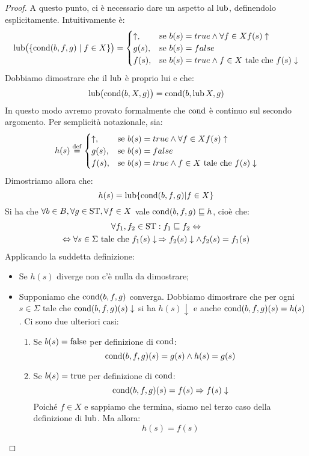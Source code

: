 \begin{proof}
A questo punto, ci è necessario dare un aspetto al $\mathop{\mathrm{lub}}\nolimits$,
definendolo esplicitamente. Intuitivamente è:
\[
  \mathop{\mathrm{lub}}\nolimits\bigl( \{ \mathrm{cond}(b,f,g) \; | \; f \in X \}\bigr)=
  \begin{cases}
    \uparrow , & \textrm{se } b(s)=true \land \forall f \in X f(s) \uparrow \\
    g(s), & \textrm{se } b(s)=false \\
    f(s), & \textrm{se } b(s)=true \land f \in X \textrm{ tale che } f(s) \downarrow
  \end{cases}
\]
Dobbiamo dimostrare che il $\mathop{\mathrm{lub}}\nolimits$ è proprio lui e che:
\[
  \mathop{\mathrm{lub}}\nolimits \bigl(\mathrm{cond}(b,X,g)\bigr) = \mathrm{cond}(b, \mathop{\mathrm{lub}}\nolimits X, g)
\]
In questo modo avremo provato formalmente che $\mathrm{cond}$ è continuo
sul secondo argomento.
Per semplicità notazionale, sia:
\[
  h(s) \defeq
  \begin{cases}
    \uparrow , & \textrm{se } b(s)=true \land \forall f \in X f(s) \uparrow \\
    g(s), & \textrm{se } b(s)=false \\
    f(s), & \textrm{se } b(s)=true \land f \in X \textrm{ tale che } f(s) \downarrow
  \end{cases}
\]
Dimostriamo allora che:
\[
  h(s) = \mathop{\mathrm{lub}}\nolimits \{\mathrm{cond}(b,f,g) | f \in X \}
\]
Si ha che $\forall b \in B, \forall g \in \mathrm{ST}, \forall f \in X$
vale $\mathrm{cond}(b,f,g) \sqsubseteq h $, cioè che:
\begin{multline*}
  \forall f_1, f_2 \in \mathrm{ST} : f_1 \sqsubseteq f_2 \Leftrightarrow \\
  \Leftrightarrow \forall s \in \Sigma \textrm{ tale che } f_{1}(s) \downarrow
  \, \Rightarrow f_{2}(s) \downarrow \land f_{2}(s) = f_{1}(s)
\end{multline*}
Applicando la suddetta definizione:
\begin{itemize}
  \item Se $h(s)$ diverge non c'è nulla da dimostrare;
  \item Supponiamo che $\mathrm{cond}(b,f,g)$ converga. Dobbiamo dimostrare che
    per ogni $s \in \Sigma$ tale che $\mathrm{cond}(b,f,g)(s) \downarrow$
    si ha $h(s) \downarrow$ e  anche $\mathrm{cond}(b,f,g)(s) = h(s)$.
  Ci sono due ulteriori casi:
  \begin{enumerate}
    \item Se $b(s) = \mathrm{false}$ per definizione di $\mathrm{cond}$:
    \[ \mathrm{cond}(b,f,g)(s) = g(s) \land h(s) = g(s) \]
    \item Se $b(s) = \mathrm{true}$ per definizione di $\mathrm{cond}$:
    \[ \mathrm{cond}(b,f,g)(s) = f(s) \Rightarrow f(s) \downarrow \]
    Poiché $f \in X$ e sappiamo che termina, siamo nel terzo caso della
    definizione di $\mathop{\mathrm{lub}}\nolimits$. Ma allora:
    \[ h(s) = f(s) \]
   \end{enumerate}
\end{itemize}


\end{proof}
